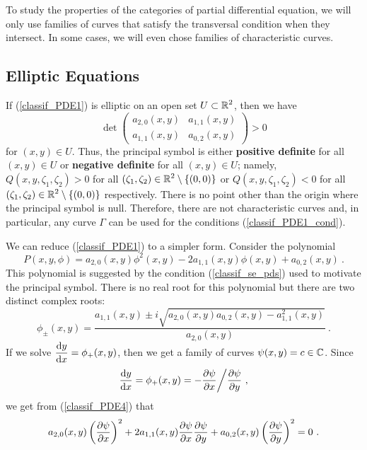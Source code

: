 To study the properties of the categories of partial differential
equation, we will only use families of curves that satisfy the
transversal condition when they intersect.  In some cases, we will
even chose families of characteristic curves.

\subsection{Elliptic Equations}

If (\ref{classif_PDE1}) is elliptic on an open set
$\displaystyle U \subset \mathbb{R}^2$, then we have
\[
\det \begin{pmatrix}
a_{2,0}(x,y) & a_{1,1}(x,y) \\
a_{1,1}(x,y) & a_{0,2}(x,y)  
\end{pmatrix}
>0
\]
for $(x,y) \in U$.  Thus, the principal symbol is either
{\bfseries positive definite}
for all $(x,y) \in U$ or
{\bfseries negative definite}
for all $(x,y) \in U$; namely, $Q(x,y,\zeta_1,\zeta_2) > 0$ for all
$\displaystyle (\zeta_1,\zeta_2) \in \mathbb{R}^2 \setminus \{(0,0)\}$ or
$Q(x,y,\zeta_1,\zeta_2) < 0$ for all
$\displaystyle (\zeta_1,\zeta_2) \in \mathbb{R}^2 \setminus \{ (0,0)\}$
respectively.  There is no point other than the origin where the
principal symbol is null. Therefore, there are not characteristic
curves and, in particular, any curve $\Gamma$ can be used for the conditions
(\ref{classif_PDE1_cond}).

We can reduce (\ref{classif_PDE1}) to a simpler form.  Consider the
polynomial
\begin{equation} \label{classif_PDE4}
P(x,y,\phi) = a_{2,0}(x,y) \phi^2(x,y) - 2a_{1,1}(x,y) \phi(x,y)
+ a_{0,2}(x,y) \ .
\end{equation}
This polynomial is suggested by the condition (\ref{classif_se_pds})
used to motivate the principal symbol.  There is no real
root for this polynomial but there are two distinct complex roots:
\[
\phi_{\pm}(x,y) = \frac{a_{1,1}(x,y) \pm i
\sqrt{ a_{2,0}(x,y)a_{0,2}(x,y)-a_{1,1}^2(x,y)}}{a_{2,0}(x,y)} \ .
\]
If we solve $\displaystyle \frac{\mathrm{d}y}{\mathrm{d}{x}} = \phi_{+}(x,y)$, then we get a family
of curves $\displaystyle \psi(x,y) = c \in \mathbb{C}$.
Since
\[
\frac{\mathrm{d}y}{\mathrm{d}{x}} = \phi_{+}(x,y) = -\frac{\partial{\psi}}{\partial x} \bigg/ \frac{\partial{\psi}}{\partial y} \ ,
\]
we get from (\ref{classif_PDE4}) that
\begin{equation} \label{classif_PDE5}
a_{2,0}(x,y) \left(\frac{\partial{\psi}}{\partial x}\right)^2 +
2a_{1,1}(x,y) \frac{\partial{\psi}}{\partial x}\frac{\partial{\psi}}{\partial y} + a_{0,2}(x,y)
\left(\frac{\partial{\psi}}{\partial y}\right)^2 = 0 \ .
\end{equation}

